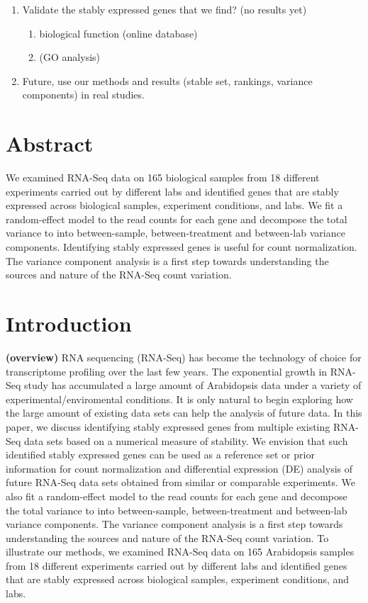 \documentclass[11pt, a4paper]{article}
\begin{document}
\begin{enumerate}
    \item
	Validate the stably expressed genes that we find? (no results yet) 
	\begin{enumerate}
	    \item
		biological function (online database) 
	    \item
		(GO analysis)
	\end{enumerate}

    \item
	Future, use our methods and results (stable set, rankings, variance
	components) in real studies.
\end{enumerate}

\newpage
\maketitle

\section*{Abstract}
We examined RNA-Seq data on 165 biological samples from 18 different
experiments carried out by different labs and identified genes that are stably
expressed across biological samples, experiment conditions, and labs. We fit a
random-effect model to the read counts for each gene and decompose the total
variance to into between-sample, between-treatment and between-lab variance
components. Identifying stably expressed genes is useful for count
normalization. The variance component analysis is a first step towards
understanding the sources and nature of the RNA-Seq count variation.


\section{Introduction}

\textbf{(overview)}
RNA sequencing (RNA-Seq) has become the technology of choice for transcriptome
profiling over the last few years. The exponential growth in RNA-Seq study has
accumulated a large amount of Arabidopsis data under a variety of
experimental/enviromental conditions.  It is only natural to begin exploring
how the large amount of existing data sets can help the analysis of future
data.  In this paper, we discuss identifying stably expressed genes from
multiple existing RNA-Seq data sets based on a numerical measure of stability.
We envision that such identified stably expressed genes can be used as a
reference set or prior information for count normalization and differential
expression (DE) analysis of future RNA-Seq data sets obtained from similar or
comparable experiments.  We also fit a random-effect model to the read counts
for each gene and decompose the total variance to into between-sample,
between-treatment and between-lab variance components. The variance component
analysis is a first step towards understanding the sources and nature of the
RNA-Seq count variation.  To illustrate our methods, we examined RNA-Seq data
on 165 Arabidopsis  samples from 18 different experiments carried out by
different labs and identified genes that are stably expressed across
biological samples, experiment conditions, and labs.  
\end{document}
